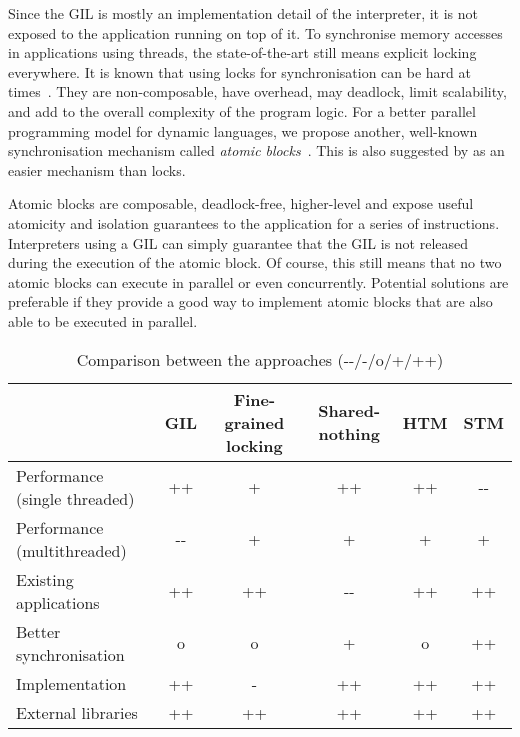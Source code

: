 \documentclass{sigplanconf}
\begin{document}
Since the GIL is mostly an implementation detail of the interpreter,
it is not exposed to the application running on top of it. To
synchronise memory accesses in applications using threads, the
state-of-the-art still means explicit locking everywhere. It is
known that using locks for synchronisation can be hard at
times~\cite{christopher10,victor11,shan08}. They are non-composable,
have overhead, may deadlock, limit scalability, and add to the overall
complexity of the program logic. For a better parallel programming
model for dynamic languages, we propose another, well-known
synchronisation mechanism called \emph{atomic
  blocks}~\cite{tim03,tim05}. This is also suggested by
\cite{christopher10,victor11} as an easier mechanism than locks.

Atomic blocks are composable, deadlock-free, higher-level and expose
useful atomicity and isolation guarantees to the application for a
series of instructions. Interpreters using a GIL can simply guarantee
that the GIL is not released during the execution of the atomic
block. Of course, this still means that no two atomic blocks can
execute in parallel or even concurrently.  Potential solutions are
preferable if they provide a good way to implement atomic blocks that
are also able to be executed in parallel.



\begin{table*}[ht]
  \centering
  \begin{tabular}{|l|c|c|c|c|c|}
    \hline
    & \textbf{GIL} & \textbf{Fine-grained locking}
    & \textbf{Shared-nothing} & \textbf{HTM} & \textbf{STM}\\
    \hline
    Performance (single threaded) & ++   & +  & ++   & ++ & -{-} \\
    \hline
    Performance (multithreaded)   & -{-} & +  & +    & +  & +    \\
    \hline
    Existing applications         & ++   & ++ & -{-} & ++ & ++   \\
    \hline
    Better synchronisation        & o    & o  & +    & o  & ++   \\
    \hline
    Implementation                & ++   & -  & ++   & ++ & ++   \\
    \hline
    External libraries            & ++   & ++ & ++   & ++ & ++   \\
    \hline
  \end{tabular}
  \caption{Comparison between the approaches (-{-}/-/o/+/++)}
  \label{tab:comparison}
\end{table*}
\end{document}
